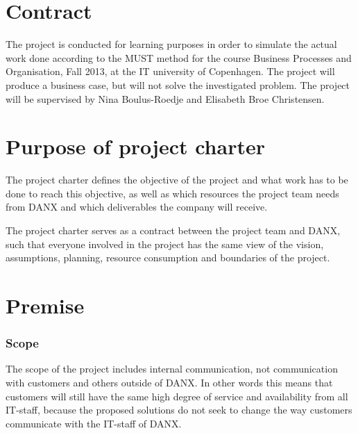 \documentclass[pdftext, 12pt, a4paper]{report}
\begin{document}

\section*{Contract}
The project is conducted for learning purposes in order to simulate the actual work done according to the MUST method for the course Business Processes and Organisation, Fall 2013, at the IT university of Copenhagen. The project will produce a business case, but will not solve the investigated problem. The project will be supervised by Nina Boulus-Roedje and Elisabeth Broe Christensen.

\section*{Purpose of project charter}
The project charter defines the objective of the project and what work has to be done to reach this objective, as well as which resources the project team needs from DANX and which deliverables the company will receive.

The project charter serves as a contract between the project team and DANX, such that everyone involved in the project has the same view of the vision, assumptions, planning, resource consumption and boundaries of the project.


\section*{Premise}
\subsubsection*{Scope}
The scope of the project includes internal communication, not communication with customers and others outside of DANX. In other words this means that customers will still have the same high degree of service and availability from all IT-staff, because the proposed solutions do not seek to change the way customers communicate with the IT-staff of DANX. 
\end{document}
